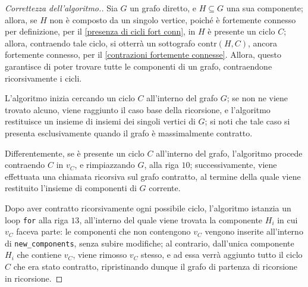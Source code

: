 \documentclass[a4paper, 12pt]{report}
\begin{document}
    \begin{proof}[Correttezza dell'algoritmo.]
        Sia $G$ un grafo diretto, e $H \subseteq G$ una sua componente; allora, se $H$ non è composto da un singolo vertice, poiché è fortemente connesso per definizione, per il \cref{presenza di cicli fort conn}, in $H$ è presente un ciclo $C$; allora, contraendo tale ciclo, si otterrà un sottografo $\mathrm{contr}(H, C)$, ancora fortemente connesso, per il \cref{contrazioni fortemente connesse}. Allora, questo garantisce di poter trovare tutte le componenti di un grafo, contraendone ricorsivamente i cicli.

        L'algoritmo inizia cercando un ciclo $C$ all'interno del grafo $G$; se non ne viene trovato alcuno, viene raggiunto il caso base della ricorsione, e l'algoritmo restituisce un insieme di insiemi dei singoli vertici di $G$; si noti che tale caso si presenta esclusivamente quando il grafo è massimalmente contratto.

        Differentemente, se è presente un ciclo $C$ all'interno del grafo, l'algoritmo procede contraendo $C$ in $v_C$, e rimpiazzando $G$, alla riga $10$; successivamente, viene effettuata una chiamata ricorsiva sul grafo contratto, al termine della quale viene restituito l'insieme di componenti di $G$ corrente.

        Dopo aver contratto ricorsivamente ogni possibile ciclo, l'algoritmo istanzia un loop \texttt{for} alla riga $13$, all'interno del quale viene trovata la componente $H_i$ in cui $v_C$ faceva parte: le componenti che non contengono $v_C$ vengono inserite all'interno di \texttt{new\_components}, senza subire modifiche; al contrario, dall'unica componente $H_i$ che contiene $v_C$, viene rimosso $v_C$ stesso, e ad essa verrà aggiunto tutto il ciclo $C$ che era stato contratto, ripristinando dunque il grafo di partenza di ricorsione in ricorsione.
    \end{proof}
\end{document}
